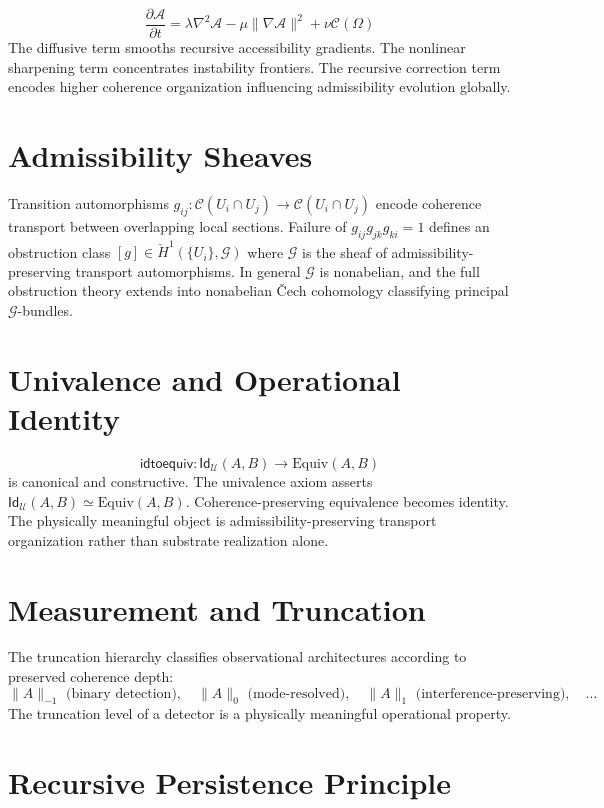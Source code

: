 \documentclass[11pt,openany]{book}
\theoremstyle{definition}
\theoremstyle{plain}
\newcommand{\idtype}{\mathsf{Id}}
\newcommand{\Afield}{\mathcal{A}}
\newcommand{\Cfield}{\mathcal{C}}
\begin{document}
\[
\frac{\partial \Afield}{\partial t}
=
\lambda \nabla^2 \Afield
-
\mu \|\nabla \Afield\|^2
+
\nu \Cfield(\Omega)
\]
The diffusive term smooths recursive accessibility gradients. The nonlinear sharpening term concentrates instability frontiers. The recursive correction term encodes higher coherence organization influencing admissibility evolution globally.

\section{Admissibility Sheaves}

Transition automorphisms $g_{ij} : \mathcal{C}(U_i \cap U_j) \to \mathcal{C}(U_i \cap U_j)$ encode coherence transport between overlapping local sections. Failure of $g_{ij} g_{jk} g_{ki} = 1$ defines an obstruction class $[g] \in \check{H}^1(\{U_i\},\mathcal{G})$ where $\mathcal{G}$ is the sheaf of admissibility-preserving transport automorphisms. In general $\mathcal{G}$ is nonabelian, and the full obstruction theory extends into nonabelian \v{C}ech cohomology classifying principal $\mathcal{G}$-bundles.

\section{Univalence and Operational Identity}

\[
\mathsf{idtoequiv} : \idtype_{\mathcal{U}}(A,B) \to \mathrm{Equiv}(A,B)
\]
is canonical and constructive. The univalence axiom asserts $\idtype_{\mathcal{U}}(A,B) \simeq \mathrm{Equiv}(A,B)$. Coherence-preserving equivalence becomes identity. The physically meaningful object is admissibility-preserving transport organization rather than substrate realization alone.

\section{Measurement and Truncation}

The truncation hierarchy classifies observational architectures according to preserved coherence depth:
\[
\|A\|_{-1} \text{ (binary detection)},\quad
\|A\|_0 \text{ (mode-resolved)},\quad
\|A\|_1 \text{ (interference-preserving)},\quad
\ldots
\]
The truncation level of a detector is a physically meaningful operational property.

\section{Recursive Persistence Principle}
\end{document}
